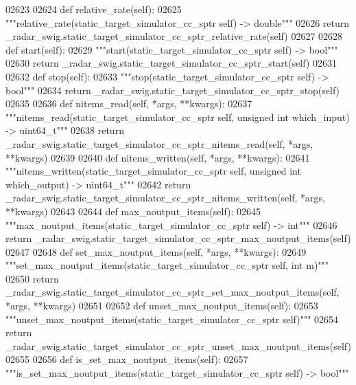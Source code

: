 \begin{DoxyCode}
{{{{{{{{{{02623 
02624     \textcolor{keyword}{def }relative_rate(self):
02625         \textcolor{stringliteral}{"""relative\_rate(static\_target\_simulator\_cc\_sptr self) -> double"""}
02626         \textcolor{keywordflow}{return} \_radar\_swig.static\_target\_simulator\_cc\_sptr\_relative\_rate(self)
02627 
02628     \textcolor{keyword}{def }start(self):
02629         \textcolor{stringliteral}{"""start(static\_target\_simulator\_cc\_sptr self) -> bool"""}
02630         \textcolor{keywordflow}{return} \_radar\_swig.static\_target\_simulator\_cc\_sptr\_start(self)
02631 
02632     \textcolor{keyword}{def }stop(self):
02633         \textcolor{stringliteral}{"""stop(static\_target\_simulator\_cc\_sptr self) -> bool"""}
02634         \textcolor{keywordflow}{return} \_radar\_swig.static\_target\_simulator\_cc\_sptr\_stop(self)
02635 
02636     \textcolor{keyword}{def }nitems_read(self, *args, **kwargs):
02637         \textcolor{stringliteral}{"""nitems\_read(static\_target\_simulator\_cc\_sptr self, unsigned int which\_input) -> uint64\_t"""}
02638         \textcolor{keywordflow}{return} \_radar\_swig.static\_target\_simulator\_cc\_sptr\_nitems\_read(self, *args, **kwargs)
02639 
02640     \textcolor{keyword}{def }nitems_written(self, *args, **kwargs):
02641         \textcolor{stringliteral}{"""nitems\_written(static\_target\_simulator\_cc\_sptr self, unsigned int which\_output) -> uint64\_t"""}
02642         \textcolor{keywordflow}{return} \_radar\_swig.static\_target\_simulator\_cc\_sptr\_nitems\_written(self, *args, **kwargs)
02643 
02644     \textcolor{keyword}{def }max_noutput_items(self):
02645         \textcolor{stringliteral}{"""max\_noutput\_items(static\_target\_simulator\_cc\_sptr self) -> int"""}
02646         \textcolor{keywordflow}{return} \_radar\_swig.static\_target\_simulator\_cc\_sptr\_max\_noutput\_items(self)
02647 
02648     \textcolor{keyword}{def }set_max_noutput_items(self, *args, **kwargs):
02649         \textcolor{stringliteral}{"""set\_max\_noutput\_items(static\_target\_simulator\_cc\_sptr self, int m)"""}
02650         \textcolor{keywordflow}{return} \_radar\_swig.static\_target\_simulator\_cc\_sptr\_set\_max\_noutput\_items(self, *args, **kwargs)
02651 
02652     \textcolor{keyword}{def }unset_max_noutput_items(self):
02653         \textcolor{stringliteral}{"""unset\_max\_noutput\_items(static\_target\_simulator\_cc\_sptr self)"""}
02654         \textcolor{keywordflow}{return} \_radar\_swig.static\_target\_simulator\_cc\_sptr\_unset\_max\_noutput\_items(self)
02655 
02656     \textcolor{keyword}{def }is_set_max_noutput_items(self):
02657         \textcolor{stringliteral}{"""is\_set\_max\_noutput\_items(static\_target\_simulator\_cc\_sptr self) -> bool"""}
}}}}}}}}}}
\end{DoxyCode}
